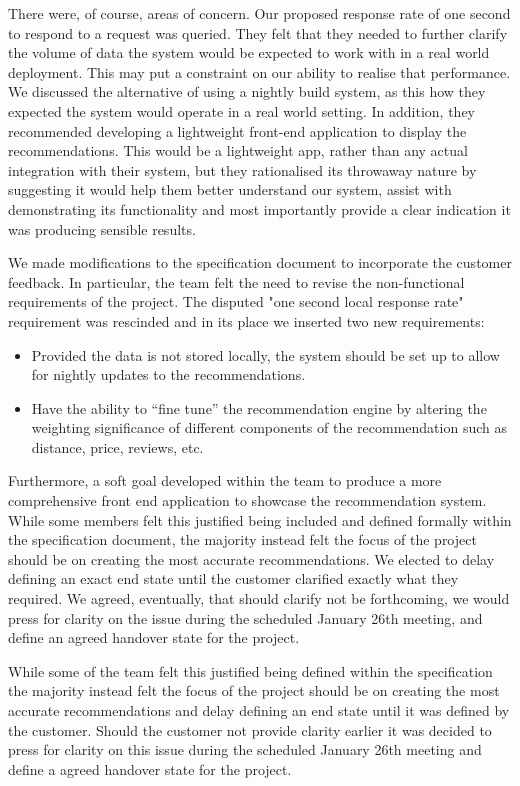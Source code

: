 \documentclass{l3proj}
\begin{document}
There were, of course, areas of concern. Our proposed response rate of one second to respond to a request was queried. They felt that they needed to further clarify the volume of data the system would be expected to work with in a real world deployment. This may put a constraint on our ability to realise that performance. We discussed the alternative of using a nightly build system, as this how they expected the system would operate in a real world setting. In addition, they recommended developing a lightweight front-end application to display the recommendations. This would be a lightweight app, rather than any actual integration with their system, but they rationalised its throwaway nature by suggesting it would help them better understand our system, assist with demonstrating its functionality and most importantly provide a clear indication it was producing sensible results. 

We made modifications to the specification document to incorporate the customer feedback. In particular, the team felt the need to revise the non-functional requirements of the project. The disputed "one second local response rate" requirement was rescinded and in its place we inserted two new requirements:

\begin{itemize}
\item Provided the data is not stored locally, the system should be set up to allow for nightly updates to the recommendations.
\item Have the ability to “fine tune” the recommendation engine by altering the weighting significance of different components of the recommendation such as distance, price, 
reviews, etc.
\end{itemize}

Furthermore, a soft goal developed within the team to produce a more comprehensive front end application to showcase the recommendation system. While some members felt this justified being included and defined formally within the specification document, the majority instead felt the focus of the project should be on creating the most accurate recommendations. We elected to delay defining an exact end state until the customer clarified exactly what they required. We agreed, eventually, that should clarify not be forthcoming, we would press for clarity on the issue during the scheduled January 26th meeting, and define an agreed handover state for the project. 

While some of the team felt this justified being defined within the specification the majority instead felt the focus of the project should be on creating the most accurate recommendations and delay defining an end state until it was defined by the customer. Should the customer not provide clarity earlier it was decided to press for clarity on this issue during the scheduled January 26th meeting and define a agreed handover state for the project. 
\end{document}
